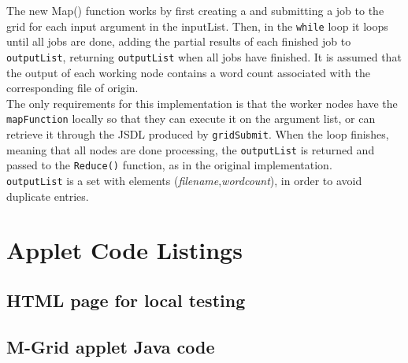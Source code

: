 \documentclass[12pt,a4paper,onecolumn]{article}
\begin{document}
The new Map() function works by first creating a and submitting a job to the grid for each input argument in the inputList. Then, in the \texttt{while} loop it loops until all jobs are done, adding the partial results of each finished job to \texttt{outputList}, returning \texttt{outputList} when all jobs have finished. It is assumed that the output of each working node contains a word count associated with the corresponding file of origin.\\

The only requirements for this implementation is that the worker nodes have the \texttt{mapFunction} locally so that they can execute it on the argument list, or can retrieve it through the JSDL produced by \texttt{gridSubmit}. When the loop finishes, meaning that all nodes are done processing, the \texttt{outputList} is returned and passed to the \texttt{Reduce()} function, as in the original implementation.\\

\texttt{outputList} is a set with elements (\textit{filename},\textit{wordcount}), in order to avoid duplicate entries.

\pagebreak
\appendix
\section{Applet Code Listings}
\subsection{HTML page for local testing}

\subsection{M-Grid applet Java code}

\end{document}

